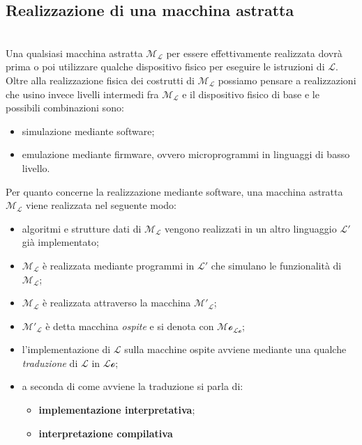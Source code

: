 \documentclass[12pt]{report}
\begin{document}
	\subsection{Realizzazione di una macchina astratta}
	{
	} \\
	Una qualsiasi macchina astratta $\mathcal{M_L}$ per essere effettivamente realizzata dovrà prima o poi utilizzare qualche dispositivo fisico per eseguire le istruzioni di $\mathcal{L}$. Oltre alla realizzazione fisica dei costrutti di $\mathcal{M_L}$ possiamo pensare a realizzazioni che usino invece livelli intermedi fra $\mathcal{M_L}$ e il dispositivo fisico di base e le possibili combinazioni sono:
	\begin{itemize}
		\item simulazione mediante software;
		\item emulazione mediante firmware, ovvero microprogrammi in linguaggi di basso livello.
	\end{itemize}
	Per quanto concerne la realizzazione mediante software, una macchina astratta $\mathcal{M_L}$ viene realizzata nel seguente modo:
	\begin{itemize}
		\item algoritmi e strutture dati di $\mathcal{M_L}$ vengono realizzati in un altro linguaggio $\mathcal{L'}$ già implementato;
		\item $\mathcal{M_L}$ è realizzata mediante programmi in $\mathcal{L'}$ che simulano le funzionalità di $\mathcal{M_L}$;
		\item $\mathcal{M_L}$ è realizzata attraverso la macchina $\mathcal{M'_L}$;
		\item $\mathcal{M'_L}$ è detta macchina \textit{ospite} e si denota con $\mathcal{M\text{o}_{L\text{o}}}$;
		\item l'implementazione di $\mathcal{L}$ sulla macchine ospite avviene mediante una qualche \textit{traduzione} di $\mathcal{L}$ in $\mathcal{L\text{o}}$;
		\item a seconda di come avviene la traduzione si parla di:
		\begin{itemize}
			\item \textbf{implementazione interpretativa};
			\item \textbf{interpretazione compilativa}
		\end{itemize}
	\end{itemize}
\end{document}

